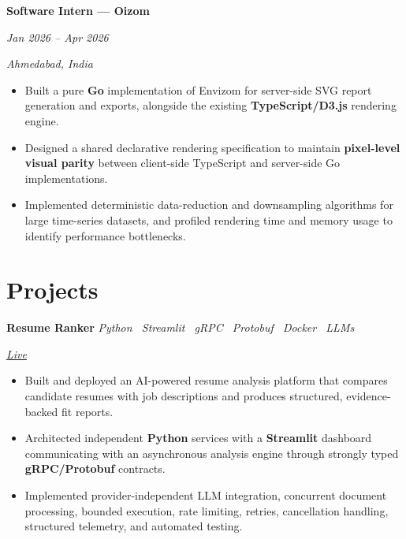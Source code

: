 \documentclass[10pt,a4paper]{article}
\newcommand{\datedentry}[2]{%
    \noindent
    \begin{minipage}[t]{0.72\linewidth}
        \raggedright
        \textbf{#1}
    \end{minipage}%
    \hfill
    \begin{minipage}[t]{0.25\linewidth}
        \raggedleft
        \textit{\color{textgray}#2}
    \end{minipage}%
    \par
}
\newcommand{\projectentry}[3]{%
    \noindent
    \begin{minipage}[t]{0.62\linewidth}
        \raggedright
        \textbf{#1}
        \hspace{0.7em}
        \textit{\color{textgray}#2}
    \end{minipage}%
    \hfill
    \begin{minipage}[t]{0.34\linewidth}
        \raggedleft
        \itshape\color{textgray}#3
    \end{minipage}%
    \par
}
\begin{document}
\datedentry
    {Software Intern --- Oizom}
    {Jan 2026 -- Apr 2026}
\vspace{1.5pt}
{\fontsize{10}{12}\selectfont
\itshape\color{textgray}
Ahmedabad, India
}
\vspace{2pt}
\begin{itemize}
    \item Built a pure \textbf{Go} implementation of Envizom for server-side SVG report generation and exports, alongside the existing \textbf{TypeScript/D3.js} rendering engine.
    \item Designed a shared declarative rendering specification to maintain \textbf{pixel-level visual parity} between client-side TypeScript and server-side Go implementations.
    \item Implemented deterministic data-reduction and downsampling algorithms for large time-series datasets, and profiled rendering time and memory usage to identify performance bottlenecks.
\end{itemize}

\section*{Projects}

\projectentry
    {Resume Ranker}
    {Python \textperiodcentered\ Streamlit \textperiodcentered\ gRPC \textperiodcentered\ Protobuf \textperiodcentered\ Docker \textperiodcentered\ LLMs}
    {\href{https://resumeranker.kishanthanki.space/}{Live}}
\vspace{2pt}
\begin{itemize}
    \item Built and deployed an AI-powered resume analysis platform that compares candidate resumes with job descriptions and produces structured, evidence-backed fit reports.
    \item Architected independent \textbf{Python} services with a \textbf{Streamlit} dashboard communicating with an asynchronous analysis engine through strongly typed \textbf{gRPC/Protobuf} contracts.
    \item Implemented provider-independent LLM integration, concurrent document processing, bounded execution, rate limiting, retries, cancellation handling, structured telemetry, and automated testing.
\end{itemize}
\end{document}
